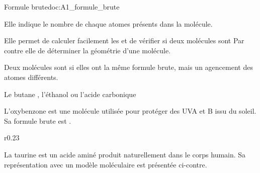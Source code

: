 %



\vspace*{-12pt}

\vspace*{-8pt}
\begin{doc}{Formule brute}{doc:A1_formule_brute}
  \begin{importants}
    Elle indique le nombre de chaque atomes présents dans la molécule.
  \end{importants}
  Elle permet de calculer facilement les  et de vérifier si deux molécules sont 
  Par contre elle  de déterminer la géométrie d'une molécule.

  \begin{importants}
    Deux molécules sont  si elles ont la même formule brute, mais un agencement des atomes différents.
  \end{importants}

  \exemple Le butane , l'éthanol  ou l'acide carbonique 
\end{doc}

L'oxybenzone est une molécule utilisée pour protéger des UVA et B issu du soleil.
Sa formule brute est  .


\vspace*{8pt}
\begin{wrapfigure}[2]{r}{0.23\linewidth}
  \centering
  \vspace*{-22pt}
\end{wrapfigure}

La taurine est un acide aminé produit naturellement dans le corps humain.
Sa représentation avec un modèle moléculaire est présentée ci-contre.

